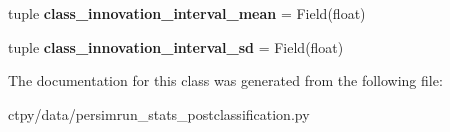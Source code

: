 \begin{DoxyCompactItemize}
\item 
\hypertarget{classctpy_1_1data_1_1persimrun__stats__postclassification_1_1_per_simrun_stats_postclassification_1_1____mongometa_____a48ed19c93fa2c0668d0444793b45181b}{tuple {\bfseries class\-\_\-innovation\-\_\-interval\-\_\-mean} = Field(float)}\label{classctpy_1_1data_1_1persimrun__stats__postclassification_1_1_per_simrun_stats_postclassification_1_1____mongometa_____a48ed19c93fa2c0668d0444793b45181b}

\item 
\hypertarget{classctpy_1_1data_1_1persimrun__stats__postclassification_1_1_per_simrun_stats_postclassification_1_1____mongometa_____a37776c83d504f61daae953ec115272ff}{tuple {\bfseries class\-\_\-innovation\-\_\-interval\-\_\-sd} = Field(float)}\label{classctpy_1_1data_1_1persimrun__stats__postclassification_1_1_per_simrun_stats_postclassification_1_1____mongometa_____a37776c83d504f61daae953ec115272ff}

\end{DoxyCompactItemize}


The documentation for this class was generated from the following file\-:\begin{DoxyCompactItemize}
\item 
ctpy/data/persimrun\-\_\-stats\-\_\-postclassification.\-py\end{DoxyCompactItemize}
